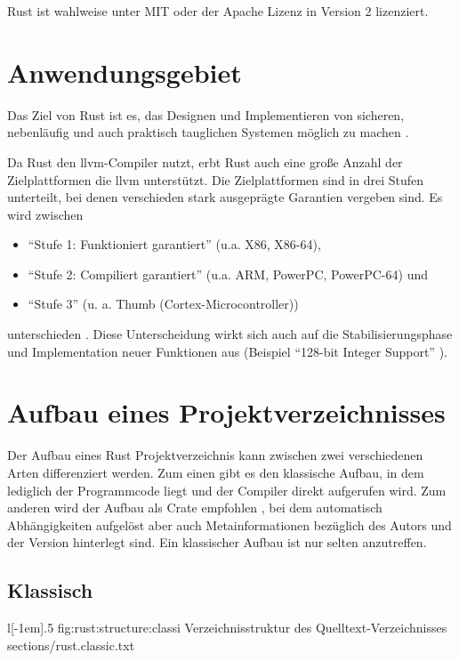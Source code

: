 Rust ist wahlweise unter MIT oder der Apache Lizenz in Version 2 lizenziert.

\section{Anwendungsgebiet}

Das Ziel von Rust ist es, das Designen und Implementieren von sicheren, nebenläufig und auch praktisch tauglichen Systemen möglich zu machen \cite{rust:faq}.

Da Rust den \gls{llvm}-Compiler nutzt, erbt Rust auch eine große Anzahl der Zielplattformen die \gls{llvm} unterstützt.
Die Zielplattformen sind in drei Stufen unterteilt, bei denen verschieden stark ausgeprägte Garantien vergeben sind. Es wird zwischen
\begin{itemize}
	\item \enquote{Stufe 1: Funktioniert garantiert} (u.a. X86, X86-64),
	\item \enquote{Stufe 2: Compiliert garantiert} (u.a. ARM, PowerPC, PowerPC-64) und
	\item \enquote{Stufe 3} (u. a. Thumb (Cortex-Microcontroller))
\end{itemize}
unterschieden \cite{rust:platform_support}.
Diese Unterscheidung wirkt sich auch auf die Stabilisierungsphase und Implementation neuer Funktionen aus (Beispiel \enquote{128-bit Integer Support} \cite{rust:github:128bit_integer}).

\section{Aufbau eines Projektverzeichnisses}

Der Aufbau eines Rust Projektverzeichnis kann zwischen zwei verschiedenen Arten differenziert werden.
Zum einen gibt es den klassische Aufbau, in dem lediglich der Programmcode liegt und der Compiler direkt aufgerufen wird.
Zum anderen wird der Aufbau als Crate empfohlen , bei dem automatisch Abhängigkeiten aufgelöst aber auch Metainformationen bezüglich des Autors und der Version hinterlegt sind.
Ein klassischer Aufbau ist nur selten anzutreffen.

\subsection{Klassisch}
\label{rust:structure:classic}
\begin{wrapfigure}{l}[-1em]{.5\textwidth}
	\rustcinclude
		{fig:rust:structure:classi}
		{Verzeichnisstruktur des Quelltext-Verzeichnisses}
		{sections/rust.classic.txt}
\end{wrapfigure}

